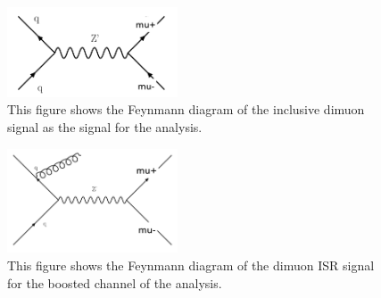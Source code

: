 \begin{figure}[!htb]
    \begin{center}
        \includegraphics[width=0.45\textwidth]{figures/chapter_dimuon/dimuonFeynman}
        \caption{
            This figure shows the Feynmann diagram of the inclusive dimuon signal as the signal for the analysis. 
        }
    \label{fig:dimuonFeynmann}
    \end{center}
\end{figure}
\FloatBarrier

\begin{figure}[!htb]
    \begin{center}
        \includegraphics[width=0.45\textwidth]{figures/chapter_dimuon/dimuonISRFeynmann}
        \caption{
        This figure shows the Feynmann diagram of the dimuon ISR signal for the boosted channel of the analysis. }
            \label{fig:dimuonISRFeynmann}
    \end{center}
\end{figure}
\FloatBarrier




